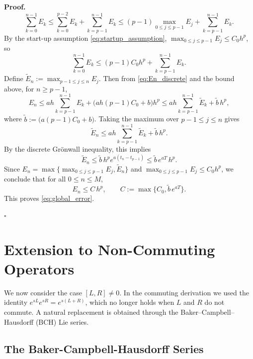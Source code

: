 \documentclass[12pt]{article}
\newenvironment{pf}{\noindent\textbf{Proof.}}{\hfill$\square$}
\begin{document}
\begin{pf}
\begin{equation*}
\sum_{k=0}^{n-1}E_k
\le \sum_{k=0}^{p-2}E_k + \sum_{k=p-1}^{n-1}E_k
\le (p-1)\max_{0\le j\le p-1}E_j + \sum_{k=p-1}^{n-1}E_k.
\end{equation*}
By the start-up assumption \eqref{eq:startup_assumption},
$\max_{0\le j\le p-1}E_j\le C_0 h^p$, so
\begin{equation*}
\sum_{k=0}^{n-1}E_k \le (p-1)C_0 h^p + \sum_{k=p-1}^{n-1}E_k.
\end{equation*}
Define $\widetilde E_n:=\max_{p-1\le j\le n}E_j$. Then from \eqref{eq:En_discrete} and the bound above,
for $n\ge p-1$,
\begin{equation*}
E_n \le a h\sum_{k=p-1}^{n-1}E_k + \bigl(a h (p-1)C_0 + b\bigr)h^p
\le a h\sum_{k=p-1}^{n-1}\widetilde E_k + \widetilde b\,h^p,
\end{equation*}
where $\widetilde b:=\bigl(a (p-1)C_0 + b\bigr)$.
Taking the maximum over $p-1\le j\le n$ gives
\begin{equation*}
\widetilde E_n \le a h\sum_{k=p-1}^{n-1}\widetilde E_k + \widetilde b\,h^p.
\end{equation*}
By the discrete Gr\"onwall inequality, this implies
\begin{equation*}
\widetilde E_n \le \widetilde b\,h^p e^{a(t_n-t_{p-1})}
\le \widetilde b\,e^{aT}\,h^p.
\end{equation*}
Since $E_n=\max\{\max_{0\le j\le p-1}E_j,\widetilde E_n\}$ and $\max_{0\le j\le p-1}E_j\le C_0 h^p$,
we conclude that for all $0\le n\le M$,
\begin{equation*}
E_n \le C\,h^p,
\qquad
C:=\max\{C_0,\widetilde b\,e^{aT}\}.
\end{equation*}
This proves \eqref{eq:global_error}.

\end{pf}

\section{Extension to Non-Commuting Operators}
\label{sec:extensions_non_comm}
We now consider the case $[L,R]\neq 0$. In the commuting derivation we used the identity
$e^{sL}e^{sR}=e^{s(L+R)}$, which no longer holds when $L$ and $R$ do not commute. A natural
replacement is obtained through the
Baker--Campbell--Hausdorff (BCH) Lie series.\\

\subsection{The Baker-Campbell-Hausdorff Series}
\end{document}

